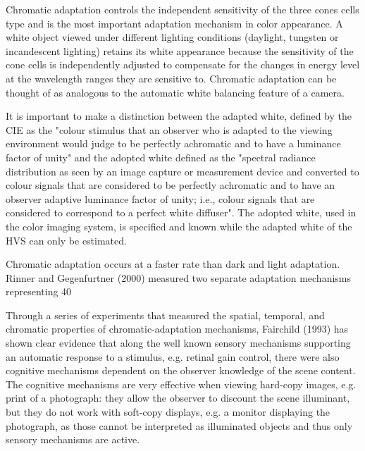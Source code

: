 Chromatic adaptation controls the independent sensitivity of the three cones cells type and is the most important adaptation mechanism in color appearance. A white object viewed under different lighting conditions (daylight, tungsten or incandescent lighting) retains its white appearance because the sensitivity of the cone cells is independently adjusted to compensate for the changes in energy level at the wavelength ranges they are sensitive to. Chromatic adaptation can be thought of as analogous to the automatic white balancing feature of a camera.

It is important to make a distinction between the adapted white, defined by the CIE as the "colour stimulus that an observer who is adapted to the viewing environment would judge to be perfectly achromatic and to have a luminance factor of unity" and the adopted white defined as the "spectral radiance distribution as seen by an image capture or measurement device and converted to colour signals that are considered to be perfectly achromatic and to have an observer adaptive luminance factor of unity; i.e., colour signals that are considered to correspond to a perfect white diffuser". The adopted white, used in the color imaging system, is specified and known while the adapted white of the HVS can only be estimated.

Chromatic adaptation occurs at a faster rate than dark and light adaptation. Rinner and Gegenfurtner (2000) measured two separate adaptation mechanisms representing 40%

Through a series of experiments that measured the spatial, temporal, and chromatic properties of chromatic-adaptation mechanisms, Fairchild (1993) has shown clear evidence that along the well known sensory mechanisms supporting an automatic response to a stimulus, e.g. retinal gain control, there were also cognitive mechanisms dependent on the observer knowledge of the scene content.
The cognitive mechanisms are very effective when viewing hard-copy images, e.g. print of a photograph: they allow the observer to discount the scene illuminant, but they do not work with soft-copy displays, e.g. a monitor displaying the photograph, as those cannot be interpreted as illuminated objects and thus only sensory mechanisms are active.

